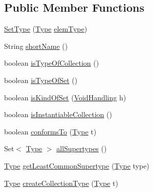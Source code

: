 \subsection*{Public Member Functions}
\begin{DoxyCompactItemize}
\item 
\hyperlink{classorg_1_1tzi_1_1use_1_1uml_1_1ocl_1_1type_1_1_set_type_a0d6c27116ca8039ca5e507bdc17abc3c}{Set\-Type} (\hyperlink{interfaceorg_1_1tzi_1_1use_1_1uml_1_1ocl_1_1type_1_1_type}{Type} \hyperlink{classorg_1_1tzi_1_1use_1_1uml_1_1ocl_1_1type_1_1_collection_type_a51cda1902aa2b4a9be4a40fa9b5b7aab}{elem\-Type})
\item 
String \hyperlink{classorg_1_1tzi_1_1use_1_1uml_1_1ocl_1_1type_1_1_set_type_a7124b1d9e9a779b589246add5de47792}{short\-Name} ()
\item 
boolean \hyperlink{classorg_1_1tzi_1_1use_1_1uml_1_1ocl_1_1type_1_1_set_type_adf41da4fd92f8f1a9db36db86de8bbb9}{is\-Type\-Of\-Collection} ()
\item 
boolean \hyperlink{classorg_1_1tzi_1_1use_1_1uml_1_1ocl_1_1type_1_1_set_type_ad18e4ff755bdba57da1834e088203a87}{is\-Type\-Of\-Set} ()
\item 
boolean \hyperlink{classorg_1_1tzi_1_1use_1_1uml_1_1ocl_1_1type_1_1_set_type_a52c3b5ad504ce51b0280cee2b0043ca2}{is\-Kind\-Of\-Set} (\hyperlink{enumorg_1_1tzi_1_1use_1_1uml_1_1ocl_1_1type_1_1_type_1_1_void_handling}{Void\-Handling} h)
\item 
boolean \hyperlink{classorg_1_1tzi_1_1use_1_1uml_1_1ocl_1_1type_1_1_set_type_a5fbe9651192f791cff2a0d16e92b9190}{is\-Instantiable\-Collection} ()
\item 
boolean \hyperlink{classorg_1_1tzi_1_1use_1_1uml_1_1ocl_1_1type_1_1_set_type_a8444bdea24a3fb21564ecfdd14f1c0bf}{conforms\-To} (\hyperlink{interfaceorg_1_1tzi_1_1use_1_1uml_1_1ocl_1_1type_1_1_type}{Type} t)
\item 
Set$<$ \hyperlink{interfaceorg_1_1tzi_1_1use_1_1uml_1_1ocl_1_1type_1_1_type}{Type} $>$ \hyperlink{classorg_1_1tzi_1_1use_1_1uml_1_1ocl_1_1type_1_1_set_type_a97b07694f30af75d494a48b7d6f63346}{all\-Supertypes} ()
\item 
\hyperlink{interfaceorg_1_1tzi_1_1use_1_1uml_1_1ocl_1_1type_1_1_type}{Type} \hyperlink{classorg_1_1tzi_1_1use_1_1uml_1_1ocl_1_1type_1_1_set_type_a24cc8ebc54610cbbec4be78770b52612}{get\-Least\-Common\-Supertype} (\hyperlink{interfaceorg_1_1tzi_1_1use_1_1uml_1_1ocl_1_1type_1_1_type}{Type} type)
\item 
\hyperlink{interfaceorg_1_1tzi_1_1use_1_1uml_1_1ocl_1_1type_1_1_type}{Type} \hyperlink{classorg_1_1tzi_1_1use_1_1uml_1_1ocl_1_1type_1_1_set_type_a9243db0e6808a04760991a630df04c74}{create\-Collection\-Type} (\hyperlink{interfaceorg_1_1tzi_1_1use_1_1uml_1_1ocl_1_1type_1_1_type}{Type} t)

\end{DoxyCompactItemize}
